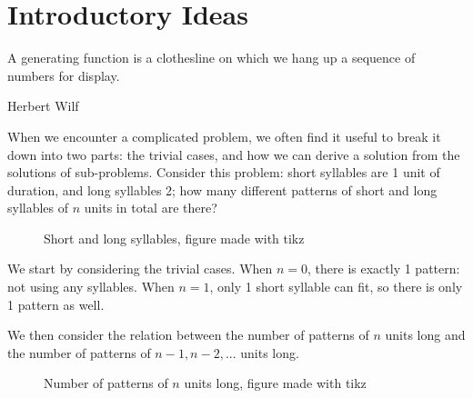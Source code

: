 \documentclass[a4paper, 12pt]{report}
\begin{document}

\tableofcontents

\chapter{Introductory Ideas}\label{ch:intro}
\epigraph{A generating function is a clothesline on which we hang up a sequence of numbers for display.}{Herbert Wilf}

When we encounter a complicated problem, we often find it useful to break it down into two parts: the trivial cases, and how we can derive a solution from the solutions of sub-problems. Consider this problem: short syllables are 1 unit of duration, and long syllables 2; how many different patterns of short and long syllables of $n$ units in total are there?

\begin{figure}[h]
    \centering
    \caption{Short and long syllables, figure made with tikz}
    \label{fig:short_long}
\end{figure}

We start by considering the trivial cases. When $n = 0$, there is exactly 1 pattern: not using any syllables. When $n = 1$, only 1 short syllable can fit, so there is only 1 pattern as well.

We then consider the relation between the number of patterns of $n$ units long and the number of patterns of $n - 1, n - 2, ...$ units long.

\begin{figure}[h]
    \centering
    \caption{Number of patterns of $n$ units long, figure made with tikz}
    \label{fig:rec}
\end{figure}
\end{document}
